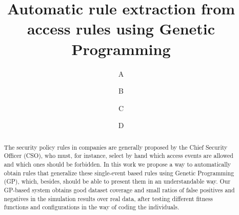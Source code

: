 \documentclass[runningheads]{llncs}
\begin{document}
%
\title{Automatic rule extraction from access rules using Genetic Programming}

 \author{A
 \and
 B
 \and
 C
 \and
 D
}


%
%
%
%
%
\maketitle              %
%
\begin{abstract}
The security policy rules in companies are generally proposed by the
Chief Security Officer (CSO), who must, for instance, select by hand
which access events are allowed and which ones should be forbidden. In
this work we propose a way to automatically obtain rules that
generalize these single-event based rules using Genetic Programming
(GP), which, besides, should be able to present them in an
understandable way. Our GP-based system obtains good dataset coverage
and small ratios of false positives and negatives in the simulation
results over real data, after testing different fitness functions and
configurations in the way of coding the individuals.

\end{abstract}
%
%
%
\end{document}
